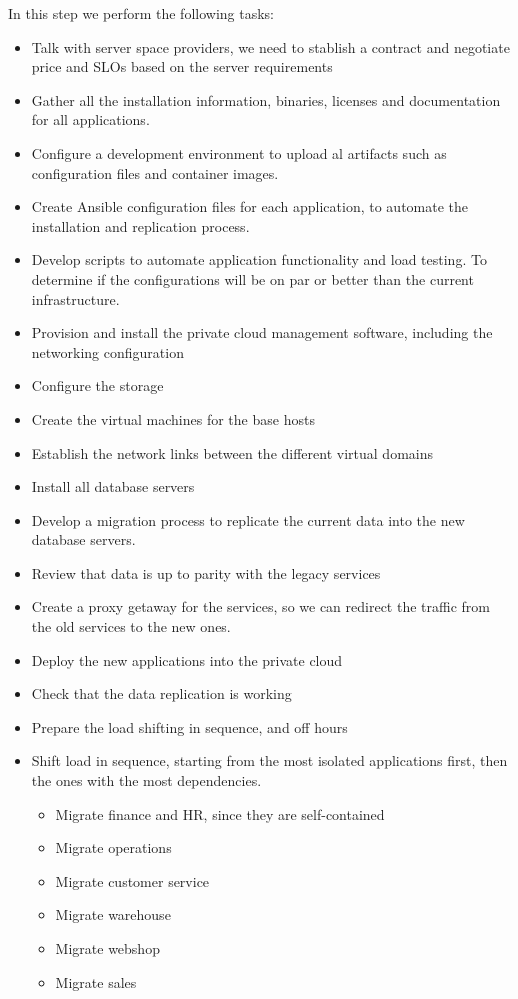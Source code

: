 \documentclass{llncs}
\begin{document}
In this step we perform the following tasks:
\begin{itemize}

  \item  Talk with server space providers, we need to stablish a contract and negotiate price and SLOs based on the server requirements
  \item Gather all the installation information, binaries, licenses and documentation for all applications.
  \item Configure a development environment to upload al artifacts such as configuration files and container images.
  \item Create Ansible configuration files for each application, to automate the installation and replication process.
  \item Develop scripts to automate application functionality and load testing. To determine if the configurations will be on par or better than the current infrastructure.
  \item  Provision and install the private cloud management software, including the networking configuration
  \item  Configure the storage
  \item Create the virtual machines for the base hosts
  \item Establish the network links between the different virtual domains
  \item Install all database servers
  \item Develop a migration process to replicate the current data into the new database servers.
  \item Review that data is up to parity with the legacy services
  \item Create a proxy getaway for the services, so we can redirect the traffic from the old services to the new ones.
  \item Deploy the new applications into the private cloud
  \item Check that the data replication is working
  \item Prepare the load shifting in sequence, and off hours
  \item Shift load in sequence, starting from the most isolated applications first, then the ones with the most dependencies.
        \begin{itemize}
          \item Migrate finance and HR, since they are self-contained
          \item Migrate operations
          \item Migrate customer service
          \item Migrate warehouse
          \item Migrate webshop
          \item Migrate sales
        \end{itemize}
\end{itemize}
\end{document}
